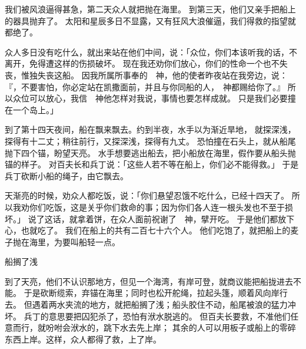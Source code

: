 {我们被风浪逼得甚急，第二天众人就把{}抛在海里。
到第三天，他们又亲手把船上的器具抛弃了。
太阳和星辰多日不显露，又有狂风大浪催逼，我们得救的指望就都绝了。
\par }{\PP {}众人多日没有吃什么，{}就出来站在他们中间，说：「众位，你们本该听我的话，不离开{}，免得遭这样的伤损破坏。
现在我还劝你们放心，你们的性命一个也不失丧，惟独失丧这船。
因我所属所事奉的　神，他的使者昨夜站在我旁边，说：
『{}，不要害怕，你必定站在凯撒面前，并且与你同船的人，　神都赐给你了。』
所以众位可以放心，我信　神他怎样对我说，事情也要怎样成就。
只是我们必要撞在一个岛上。」
\par }{\PP {}到了第十四天夜间，船在{}飘来飘去。约到半夜，水手以为渐近旱地，
就探深浅，探得有十二丈；稍往前行，又探深浅，探得有九丈。
恐怕撞在石头上，就从船尾抛下四个锚，盼望天亮。
水手想要逃出船去，把小船放在海里，假作要从船头抛锚的样子。
对百夫长和兵丁说：「这些人若不等在船上，你们必不能得救。」
于是兵丁砍断小船的绳子，由它飘去。
\par }{\PP {}天渐亮的时候，{}劝众人都吃饭，说：「你们悬望忍饿不吃什么，已经十四天了。
所以我劝你们吃饭，这是关乎你们救命的事；因为你们各人连一根头发也不至于损坏。」
说了这话，就拿着饼，在众人面前祝谢了　神，擘开吃。
于是他们都放下心，也就吃了。
我们在船上的共有二百七十六个人。
他们吃饱了，就把船上的麦子抛在海里，为要叫船轻一点。
\par }{\SH 船搁了浅
\par }{\PP {}到了天亮，他们不认识那地方，但见一个海湾，有岸可登，就商议能把船拢进去不能。
于是砍断缆索，弃锚在海里；同时也松开舵绳，拉起头篷，顺着风向岸行去。
但遇着两水夹流的地方，就把船搁了浅；船头胶住不动，船尾被浪的猛力冲坏。
兵丁的意思要把囚犯杀了，恐怕有洑水脱逃的。
但百夫长要救{}，不准他们任意而行，就吩咐会洑水的，跳下水去先上岸；
其余的人可以用板子或船上的零碎东西上岸。这样，众人都得了救，上了岸。

}
